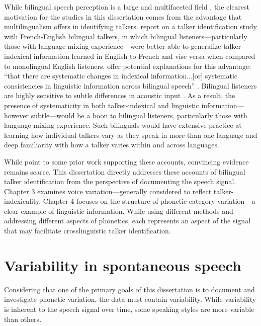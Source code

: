 While bilingual speech perception is a large and multifaceted field \citep{ingvalson_2014_bilingual}, the clearest motivation for the studies in this dissertation comes from the advantage that multilingualism offers in identifying talkers. \citet{orena_2019_identifying} report on a talker identification study with French-English bilingual talkers, in which bilingual listeners---particularly those with language mixing experience---were better able to generalize talker-indexical information learned in English to French and vise versa when compared to monolingual English listeners. \citeauthor{orena_2019_identifying} offer potential explanations for this advantage: ``that there are systematic changes in indexical information...[or] systematic consistencies in linguistic information across bilingual speech'' \citeyearpar[][p. EL308]{orena_2019_identifying}. Bilingual listeners are highly sensitive to subtle differences in acoustic input \citep{ju_2004_falling}. As a result, the presence of systematicity in both talker-indexical and linguistic information---however subtle---would be a boon to bilingual listeners, particularly those with language mixing experience. Such bilinguals would have extensive practice at learning how individual talkers vary as they speak in more than one language and deep familiarity with how a talker varies within and across languages. 

While \citet{orena_2019_identifying} point to some prior work supporting these accounts, convincing evidence remains scarce. This dissertation directly addresses these accounts of bilingual talker identification from the perspective of documenting the speech signal. Chapter 3 examines voice variation---generally considered to reflect talker-indexicality. Chapter 4 focuses on the structure of phonetic category variation---a clear example of linguistic information. While using different methods and addressing different aspects of phonetics, each represents an aspect of the signal that may facilitate crosslinguistic talker identification.


\section{Variability in spontaneous speech}\label{ch1:sec:spontaneous}


Considering that one of the primary goals of this dissertation is to document and investigate phonetic variation, the data must contain variability. While variability is inherent to the speech signal over time, some speaking styles are more variable than others.

